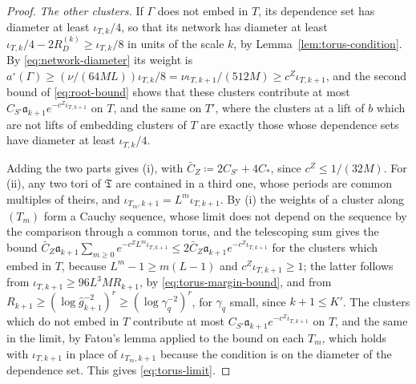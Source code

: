 \documentclass[11pt]{preprint}
\numberwithin{equation}{section}
\theoremstyle{definition}
\theoremstyle{remark}
\theoremstyle{plain}
\begin{document}
\begin{proof}
\emph{The other clusters.} If $\Gamma$ does not embed in $T$, its dependence set has diameter at least $\iota_{T,k}/4$, so that its network has diameter at least $\iota_{T,k}/4 - 2R^{(k)}_D \geq \iota_{T,k}/8$ in units of the scale $k$, by Lemma~\ref{lem:torus-condition}. By \eqref{eq:network-diameter} its weight is $a^\circ(\Gamma) \geq (\nu/(64ML))\iota_{T,k}/8 = \nu\iota_{T,k+1}/(512M) \geq c^Z\iota_{T,k+1}$, and the second bound of \eqref{eq:root-bound} shows that these clusters contribute at most $C_{S'}\mathfrak a_{k+1}e^{-c^Z\iota_{T,k+1}}$ on $T$, and the same on $T'$, where the clusters at a lift of $b$ which are not lifts of embedding clusters of $T$ are exactly those whose dependence sets have diameter at least $\iota_{T,k}/4$.

Adding the two parts gives (i), with $\bar C_Z \coloneqq 2C_{S'} + 4C_*$, since $c^Z \leq 1/(32M)$. For (ii), any two tori of $\mathfrak T$ are contained in a third one, whose periods are common multiples of theirs, and $\iota_{T_m,k+1} = L^m\iota_{T,k+1}$. By (i) the weights of a cluster along $(T_m)$ form a Cauchy sequence, whose limit does not depend on the sequence by the comparison through a common torus, and the telescoping sum gives the bound $\bar C_Z\mathfrak a_{k+1}\sum_{m \geq 0}e^{-c^ZL^m\iota_{T,k+1}} \leq 2\bar C_Z\mathfrak a_{k+1}e^{-c^Z\iota_{T,k+1}}$ for the clusters which embed in $T$, because $L^m - 1 \geq m(L - 1)$ and $c^Z\iota_{T,k+1} \geq 1$; the latter follows from $\iota_{T,k+1} \geq 96L^3MR_{k+1}$, by \eqref{eq:torus-margin-bound}, and from $R_{k+1} \geq (\log\hat g_{k+1}^{-2})^r \geq (\log\gamma_q^{-2})^r$, for $\gamma_q$ small, since $k + 1 \leq K'$. The clusters which do not embed in $T$ contribute at most $C_{S'}\mathfrak a_{k+1}e^{-c^Z\iota_{T,k+1}}$ on $T$, and the same in the limit, by Fatou's lemma applied to the bound on each $T_m$, which holds with $\iota_{T,k+1}$ in place of $\iota_{T_m,k+1}$ because the condition is on the diameter of the dependence set. This gives \eqref{eq:torus-limit}.
\end{proof}
\end{document}
